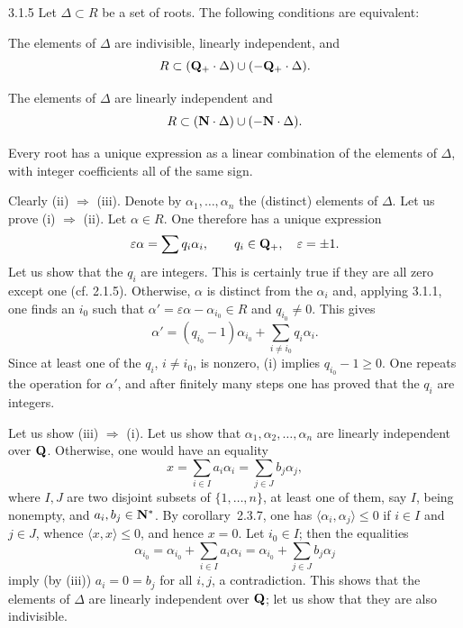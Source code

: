 \begin{proposition}{3.1.5}\label{XXI.3.1.5}
Let $\Delta\subset R$ be a set of roots. The following conditions are equivalent:
\begin{enumeratei}
\item The elements of $\Delta$ are indivisible, linearly independent, and
\[
R\subset(\mathbf{Q}_+\cdot\Delta)\cup(-\mathbf{Q}_+\cdot\Delta).
\]
\item The elements of $\Delta$ are linearly independent and
\[
R\subset(\mathbf{N}\cdot\Delta)\cup(-\mathbf{N}\cdot\Delta).
\]
\item Every root has a unique expression as a linear combination of the elements of $\Delta$, with integer coefficients all of the same sign.
\end{enumeratei}
\end{proposition}
{\renewcommand{\thefootnote}{(7)}}%
Clearly (ii) $\Rightarrow$ (iii). Denote by $\alpha_1,\ldots,\alpha_n$ the (distinct) elements of $\Delta$. Let us prove (i) $\Rightarrow$ (ii). Let $\alpha\in R$. One therefore has a unique expression
\[
\varepsilon\alpha=\sum q_i\alpha_i,\qquad q_i\in\mathbf{Q}_+,\quad\varepsilon=\pm1.
\]
Let us show that the $q_i$ are integers. This is certainly true if they are all zero except one (cf. 2.1.5). Otherwise, $\alpha$ is distinct from the $\alpha_i$ and, applying 3.1.1, one finds an $i_0$ such that $\alpha'=\varepsilon\alpha-\alpha_{i_0}\in R$ and $q_{i_0}\ne0$. This gives
\[
\alpha'=(q_{i_0}-1)\alpha_{i_0}+\sum_{i\ne i_0}q_i\alpha_i.
\]
Since at least one of the $q_i$, $i\ne i_0$, is nonzero, (i) implies $q_{i_0}-1\geq0$. One repeats the operation for $\alpha'$, and after finitely many steps one has proved that the $q_i$ are integers.

Let us show (iii) $\Rightarrow$ (i). Let us show that $\alpha_1,\alpha_2,\ldots,\alpha_n$ are linearly independent over $\mathbf{Q}$. Otherwise, one would have an equality
\[
x=\sum_{i\in I}a_i\alpha_i=\sum_{j\in J}b_j\alpha_j,
\]
where $I,J$ are two disjoint subsets of $\{1,\ldots,n\}$, at least one of them, say $I$, being nonempty, and $a_i,b_j\in\mathbf{N}^*$. By corollary~2.3.7, one has $\langle\alpha_i,\alpha_j\rangle\leq0$ if $i\in I$ and $j\in J$, whence $\langle x,x\rangle\leq0$, and hence $x=0$. Let $i_0\in I$; then the equalities
\[
\alpha_{i_0}=\alpha_{i_0}+\sum_{i\in I}a_i\alpha_i=\alpha_{i_0}+\sum_{j\in J}b_j\alpha_j
\]
imply (by (iii)) $a_i=0=b_j$ for all $i,j$, a contradiction. This shows that the elements of $\Delta$ are linearly independent over $\mathbf{Q}$; let us show that they are also indivisible.

